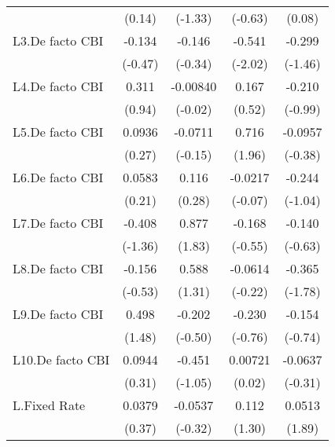 {\begin{longtable}{l*{4}{c}}
                &   (0.14)         &  (-1.33)         &  (-0.63)         &   (0.08)         \\
[1em]
L3.De facto CBI &   -0.134         &   -0.146         &   -0.541\sym{*}  &   -0.299         \\
                &  (-0.47)         &  (-0.34)         &  (-2.02)         &  (-1.46)         \\
[1em]
L4.De facto CBI &    0.311         & -0.00840         &    0.167         &   -0.210         \\
                &   (0.94)         &  (-0.02)         &   (0.52)         &  (-0.99)         \\
[1em]
L5.De facto CBI &   0.0936         &  -0.0711         &    0.716         &  -0.0957         \\
                &   (0.27)         &  (-0.15)         &   (1.96)         &  (-0.38)         \\
[1em]
L6.De facto CBI &   0.0583         &    0.116         &  -0.0217         &   -0.244         \\
                &   (0.21)         &   (0.28)         &  (-0.07)         &  (-1.04)         \\
[1em]
L7.De facto CBI &   -0.408         &    0.877         &   -0.168         &   -0.140         \\
                &  (-1.36)         &   (1.83)         &  (-0.55)         &  (-0.63)         \\
[1em]
L8.De facto CBI &   -0.156         &    0.588         &  -0.0614         &   -0.365         \\
                &  (-0.53)         &   (1.31)         &  (-0.22)         &  (-1.78)         \\
[1em]
L9.De facto CBI &    0.498         &   -0.202         &   -0.230         &   -0.154         \\
                &   (1.48)         &  (-0.50)         &  (-0.76)         &  (-0.74)         \\
[1em]
L10.De facto CBI&   0.0944         &   -0.451         &  0.00721         &  -0.0637         \\
                &   (0.31)         &  (-1.05)         &   (0.02)         &  (-0.31)         \\
[1em]
L.Fixed Rate    &   0.0379         &  -0.0537         &    0.112         &   0.0513         \\
                &   (0.37)         &  (-0.32)         &   (1.30)         &   (1.89)         \\

\end{longtable}}
